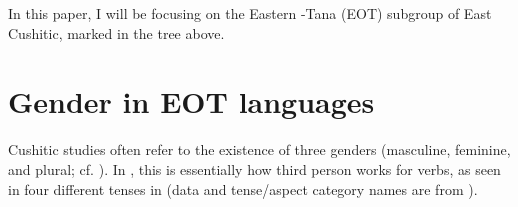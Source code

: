 \documentclass[output=paper,modfonts]{langscibook}
\begin{document}
In this paper, I will be focusing on the Eastern -Tana (EOT) subgroup of East Cushitic, marked in the tree above.

\section{Gender in EOT languages}\label{sec:paster:3}

Cushitic studies often refer to the existence of three genders (masculine, feminine, and plural; cf.  \citealt{CorbettHayward1987}). In , this is essentially how third person  works for verbs, as seen in four different tenses in  (data and tense/aspect category names are from \citealt{Paster2007}).

\end{document}
